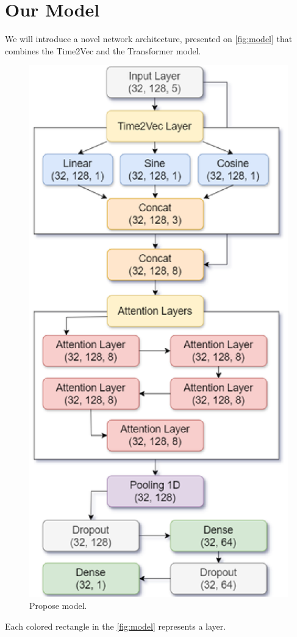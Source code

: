 \section{Our Model}
We will introduce a novel network architecture, presented on \autoref{fig:model} that combines the Time2Vec and the Transformer model.
\begin{figure}[H]
	\centering
	\includegraphics[width=0.6\linewidth]{images/model.eps}
	\caption{Propose model.}
	\label{fig:model}
\end{figure}

Each colored rectangle in the \autoref{fig:model} represents a layer.


